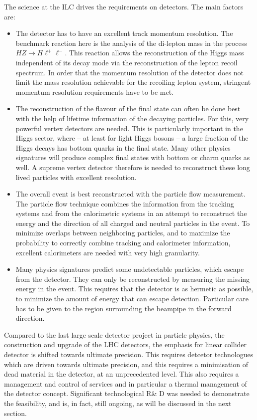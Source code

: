 \documentclass[%
 reprint,
 amsmath,amssymb,
 aps,
]{revtex4-1}
\begin{document}
The science at the ILC drives the requirements on detectors. The main factors are:
\begin{itemize}
 \item The detector has to have an excellent track momentum
   resolution. The benchmark reaction here is the analysis 
of the di-lepton mass in the process $HZ \to H \ell^+
\ell^-$. This reaction allows the reconstruction of the 
Higgs mass independent of its decay mode via the 
reconstruction of the lepton recoil spectrum. In order that 
the momentum resolution of the detector does not limit 
the mass resolution achievable for the recoiling lepton 
system, stringent momentum resolution requirements have to be met. 
\item The reconstruction of the flavour of the final state can 
often be done best with the help of lifetime information of the 
decaying particles. For this, very powerful vertex detectors 
are needed. This is particularly important 
in the Higgs sector, where -- at least for light Higgs bosons -- 
a large fraction of the Higgs decays has bottom 
quarks in the final state. Many other physics signatures will 
produce complex final states with bottom or charm quarks as well. 
A supreme vertex detector therefore is needed to reconstruct these 
long lived particles with excellent resolution. 
\item The overall event is best reconstructed with the 
particle flow measurement. The particle flow technique combines 
the information from the tracking systems and from the 
calorimetric systems in an attempt to reconstruct the 
energy and the direction of all charged and 
neutral particles in the event. To minimize overlaps between 
neighboring particles, and to maximize the probability to 
correctly combine tracking and calorimeter information, 
excellent calorimeters are needed with very high granularity. 
\item Many physics signatures predict some undetectable particles, 
which escape from the detector. They can only be reconstructed by 
measuring the missing energy in the event. This requires 
that the detector is as hermetic as possible, to 
minimize the amount of energy that can escape detection. 
Particular care has to be given to the region surrounding the 
beampipe in the forward direction. 
\end{itemize}

Compared to the last large scale detector project in particle physics, the construction and upgrade of the LHC detectors, the emphasis for linear collider detector is shifted towards ultimate precision. This requires detcetor technologues which are driven towards ultimate precision, and this requires a minimisation of dead material in the detector, at an unprecedented level. This also requires a management and control of services and in particular a thermal management of the detector concept. Significant technological R\& D was needed to demonstrate the feasibility, and is, in fact, still ongoing, as will be discussed in the next section.  
\end{document}
